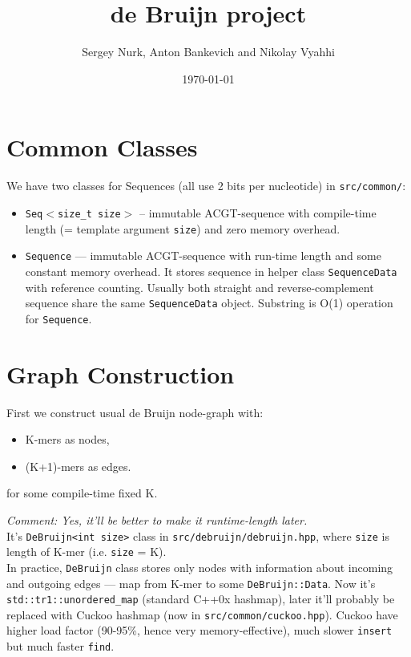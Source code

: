 \documentclass[14pt]{article}
\title{de Bruijn project}
\author{Sergey Nurk, Anton Bankevich and Nikolay Vyahhi}
\date{\today}
\begin{document}
\maketitle

\section{Common Classes}

We have two classes for Sequences (all use 2 bits per nucleotide) in \texttt{src/common/}:
\begin{itemize}
\item \texttt{Seq$<$size\_t size$>$} -- immutable ACGT-sequence with compile-time length (= template argument \texttt{size}) and zero memory overhead.
\item \texttt{Sequence} --- immutable ACGT-sequence with run-time length and some constant memory overhead. It stores sequence in helper class \texttt{SequenceData} with reference counting. Usually both straight and reverse-complement sequence share the same \texttt{SequenceData} object. Substring is O(1) operation for \texttt{Sequence}.
\end{itemize}

\section{Graph Construction}

First we construct usual de Bruijn node-graph with:
\begin{itemize}
\item K-mers as nodes,
\item (K+1)-mers as edges.
\end{itemize}
for some compile-time fixed K. 

\textit{Comment: Yes, it'll be better to make it runtime-length later.} \\

It's \texttt{DeBruijn<int size>} class in \texttt{src/debruijn/debruijn.hpp}, where \texttt{size} is length of K-mer (i.e. \texttt{size} = K). \\

In practice, \texttt{DeBruijn} class stores only nodes with information about incoming and outgoing edges --- map from K-mer to some \texttt{DeBruijn::Data}. Now it's \texttt{std::tr1::unordered\_map} (standard C++0x hashmap), later it'll probably be replaced with Cuckoo hashmap (now in \texttt{src/common/cuckoo.hpp}). Cuckoo have higher load factor (90-95\%, hence very memory-effective), much slower \texttt{insert} but much faster \texttt{find}.
\end{document}
